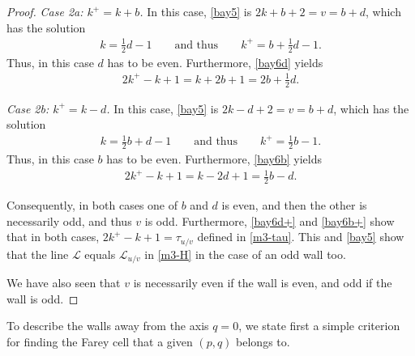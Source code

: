 \documentclass[11pt,reqno,tbtags,a4paper]{amsart}
\numberwithin{equation}{section}
\theoremstyle{plain}%
\theoremstyle{definition}
\theoremstyle{remark}
\newcounter{cases}
\newcommand\pfcase[2]{\smallskip\noindent\emph{Case #1: #2} \noindent}
\newcommand\LL{{\mathcal L}}
\newcommand\HG{\mathcal L} %
\newcommand\uv{_{u/v}}
\newcommand\kx{{k^+}}
\newcommand\0{{\boldsymbol 0}}
\newcommand\1{{\boldsymbol 1}}
\begin{document}
\begin{proof}
\pfcase{2a}{$\kx=k+b$.}
In this case, \eqref{bay5} is $2k+b+2=v=b+d$, which has the solution
\begin{align}\label{bay6d}
  k=\tfrac12d-1
\qquad\text{and thus}\qquad
\kx=b+\tfrac12d-1.
\end{align}
Thus, in this case $d$ has to be even.
Furthermore, \eqref{bay6d} yields
\begin{align}\label{bay6d+}
  2\kx-k+1=k+2b+1=2b+\tfrac12 d.
\end{align}

\pfcase{2b}{$\kx=k-d$.}
In this case, \eqref{bay5} is $2k-d+2=v=b+d$, which has the solution
\begin{align}\label{bay6b}
  k=\tfrac12b+d-1
\qquad\text{and thus}\qquad
\kx=\tfrac12b-1.
\end{align}
Thus, in this case $b$ has to be even.
Furthermore, \eqref{bay6b} yields
\begin{align}\label{bay6b+}
  2\kx-k+1=k-2d+1=\tfrac12b- d.
\end{align}

Consequently, in both cases one of $b$ and $d$ is even, and then the other
is necessarily odd, and thus $v$ is odd.
Furthermore, \eqref{bay6d+} and \eqref{bay6b+} show that in both cases, 
$2\kx-k+1=\tau\uv$ defined in \eqref{m3-tau}. This and \eqref{bay5}
show that the line $\LL$ equals $\HG\uv$ in \eqref{m3-H} in the case of an odd
wall too.

We have also seen that $v$ is necessarily even if the wall is even,
and odd if the wall is odd.
\end{proof}

To describe the walls  away from the axis $q=0$,
we state first a simple criterion for finding the Farey cell that a given
$(p,q)$ belongs to.
\end{document}

